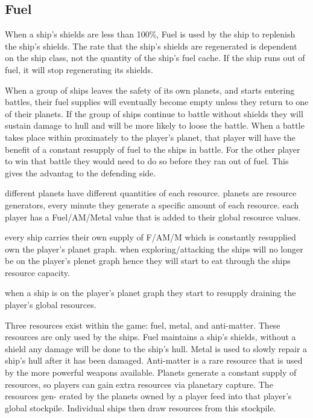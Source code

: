 \subsection{Fuel}
When a ship's shields are less than 100\%, Fuel is used by the ship to replenish the ship's shields.
The rate that the ship's shields are regenerated is dependent on the ship class, not the quantity of the ship's fuel cache.
If the ship runs out of fuel, it will stop regenerating its shields.

When a group of ships leaves the safety of its own planets, and starts entering battles, their fuel supplies will eventually become empty unless they return to one of their planets. 
If the group of ships continue to battle without shields they will sustain damage to hull and will be more likely to loose the battle.
When a battle takes place within proximately to the player's planet, that player will have the benefit of a constant resupply of fuel to the ships in battle. For the other player to win that battle they would need to do so before they ran out of fuel.
This gives the advantag to the defending side.




		different planets have different quantities of each resource.
		planets are resource generators, every minute they generate a specific amount of each resource.
		each player has a Fuel/AM/Metal value that is added to their global resource values.

		every ship carries their own supply of F/AM/M which is constantly resupplied own the player's planet graph.
		when exploring/attacking the ships will no longer be on the player's plenet graph hence they will start to eat through the ships resource capacity.

		when a ship is on the player's planet graph they start to resupply draining the player's global resources.





Three resources exist within the game: fuel, metal, and anti-matter. These resources are only used by the ships. Fuel maintains a ship’s shields, without a shield any damage will be done to the ship’s hull. Metal is used to slowly repair a ship’s hull after it has been damaged. Anti-matter is a rare resource that is used by the more powerful weapons available.
Planets generate a constant supply of resources, so players can gain extra resources via planetary capture. The resources gen- erated by the planets owned by a player feed into that player’s global stockpile. Individual ships then draw resources from this stockpile.